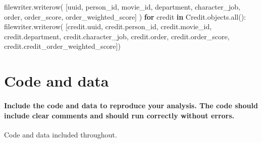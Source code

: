 \documentclass[
]{article}
\newenvironment{Shaded}{\begin{snugshade}}{\end{snugshade}}
\newcommand{\BuiltInTok}[1]{#1}
\newcommand{\ControlFlowTok}[1]{\textcolor[rgb]{0.13,0.29,0.53}{\textbf{#1}}}
\newcommand{\KeywordTok}[1]{\textcolor[rgb]{0.13,0.29,0.53}{\textbf{#1}}}
\newcommand{\NormalTok}[1]{#1}
\newcommand{\StringTok}[1]{\textcolor[rgb]{0.31,0.60,0.02}{#1}}
\begin{document}
\begin{Shaded}
\begin{Highlighting}[]
\NormalTok{                filewriter.writerow(}
\NormalTok{                    [}\StringTok{\textquotesingle{}uuid\textquotesingle{}}\NormalTok{, }\StringTok{\textquotesingle{}person\_id\textquotesingle{}}\NormalTok{, }\StringTok{\textquotesingle{}movie\_id\textquotesingle{}}\NormalTok{, }\StringTok{\textquotesingle{}department\textquotesingle{}}\NormalTok{, }\StringTok{\textquotesingle{}character\_job\textquotesingle{}}\NormalTok{, }\StringTok{\textquotesingle{}order\textquotesingle{}}\NormalTok{, }\StringTok{\textquotesingle{}order\_score\textquotesingle{}}\NormalTok{,}
                     \StringTok{\textquotesingle{}order\_weighted\_score\textquotesingle{}}\NormalTok{]}
\NormalTok{                )}
                \ControlFlowTok{for}\NormalTok{ credit }\KeywordTok{in}\NormalTok{ Credit.objects.}\BuiltInTok{all}\NormalTok{():}
\NormalTok{                    filewriter.writerow(}
\NormalTok{                        [credit.uuid, credit.person\_id, credit.movie\_id, credit.department, credit.character\_job,}
\NormalTok{                         credit.order, credit.order\_score, credit.credit\_order\_weighted\_score])}
\end{Highlighting}
\end{Shaded}

\hypertarget{code-and-data}{%
\section{Code and data}\label{code-and-data}}

\hypertarget{include-the-code-and-data-to-reproduce-your-analysis.-the-code-should-include-clear-comments-and-should-run-correctly-without-errors.}{%
\paragraph{Include the code and data to reproduce your analysis. The
code should include clear comments and should run correctly without
errors.}\label{include-the-code-and-data-to-reproduce-your-analysis.-the-code-should-include-clear-comments-and-should-run-correctly-without-errors.}}

Code and data included throughout.
\end{document}
